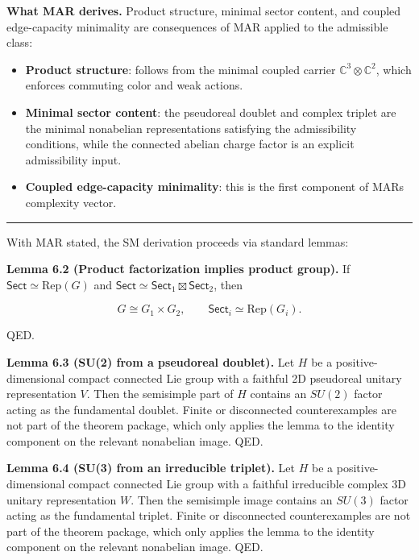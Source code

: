 \textbf{What MAR derives.} Product structure, minimal sector content, and coupled edge-capacity minimality are consequences of MAR applied to the admissible class:

\begin{itemize}
\tightlist
\item
  \textbf{Product structure}: follows from the minimal coupled carrier \(\mathbb{C}^3 \otimes \mathbb{C}^2\), which enforces commuting color and weak actions.
\item
  \textbf{Minimal sector content}: the pseudoreal doublet and complex triplet are the minimal nonabelian representations satisfying the admissibility conditions, while the connected abelian charge factor is an explicit admissibility input.
\item
  \textbf{Coupled edge-capacity minimality}: this is the first component of MAR\textquotesingle s complexity vector.
\end{itemize}

\begin{center}\rule{0.5\linewidth}{0.5pt}\end{center}

With MAR stated, the SM derivation proceeds via standard lemmas:

\textbf{Lemma 6.2 (Product factorization implies product group).} If \(\mathsf{Sect} \simeq \mathrm{Rep}(G)\) and \(\mathsf{Sect} \simeq \mathsf{Sect}_1 \boxtimes \mathsf{Sect}_2\), then

\[
G \cong G_1 \times G_2,
\qquad
\mathsf{Sect}_i \simeq \mathrm{Rep}(G_i).
\]

QED.

\textbf{Lemma 6.3 (SU(2) from a pseudoreal doublet).} Let \(H\) be a positive-dimensional compact connected Lie group with a faithful 2D pseudoreal unitary representation \(V\). Then the semisimple part of \(H\) contains an \(SU(2)\) factor acting as the fundamental doublet. Finite or disconnected counterexamples are not part of the theorem package, which only applies the lemma to the identity component on the relevant nonabelian image. QED.

\textbf{Lemma 6.4 (SU(3) from an irreducible triplet).} Let \(H\) be a positive-dimensional compact connected Lie group with a faithful irreducible complex 3D unitary representation \(W\). Then the semisimple image contains an \(SU(3)\) factor acting as the fundamental triplet. Finite or disconnected counterexamples are not part of the theorem package, which only applies the lemma to the identity component on the relevant nonabelian image. QED.

